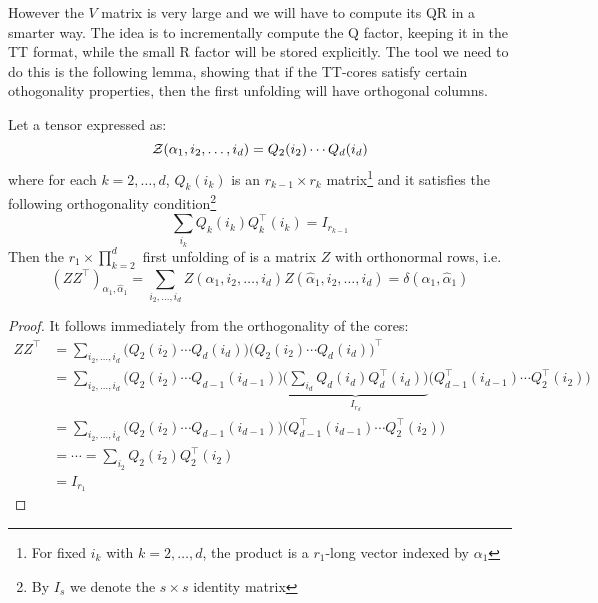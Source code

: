 However the $V$ matrix is very large and we will have to compute its QR in a smarter way. The idea is to incrementally compute the Q factor, keeping it in the TT format, while the small R factor will be stored explicitly. The tool we need to do this is the following lemma, showing that if the TT-cores satisfy certain othogonality properties, then the first unfolding will have orthogonal columns.
\begin{Lemma}
  Let a tensor \Z expressed as:
  \begin{equation*}
    \mathcal{Z}(\alpha_1,i_2,\ldots,i_d) = Q_2(i_2) \cdots Q_d(i_d)
  \end{equation*}
  where for each $k = 2,\ldots,d$, $Q_k(i_k)$ is an $r_{k-1} \times r_k$ matrix\footnote{For fixed $i_k$ with $k=2,\ldots,d$, the product is a $r_1$-long vector indexed by $\alpha_1$} and it satisfies the following orthogonality condition\footnote{By $I_s$ we denote the $s \times s$ identity matrix}
  \begin{equation} \label{eq:orth_cond}
    \sum_{i_k} Q_k(i_k) Q_k^{\top}(i_k) = I_{r_{k-1}}
  \end{equation}
  Then the $r_1 \times \prod_{k=2}^d$ first unfolding of \Z is a matrix $Z$ with orthonormal rows, i.e.
  \begin{equation*}
    (Z Z^\top)_{\alpha_1,\hat{\alpha}_1} = \sum_{i_2,\ldots,i_d} Z(\alpha_1,i_2,\ldots,i_d) Z(\hat{\alpha}_1,i_2,\ldots,i_d) = \delta(\alpha_1,\hat{\alpha}_1)
  \end{equation*}

  \begin{proof}
    It follows immediately from the orthogonality of the cores:
    \begin{equation*}
      \begin{split}
        ZZ^\top &= \sum_{i_2,\ldots,i_d} \Big( Q_2(i_2) \cdots Q_d(i_d) \Big) \Big( Q_2(i_2) \cdots Q_d(i_d) \Big)^\top \\
        &= \sum_{i_2,\ldots,i_d} \Big( Q_2(i_2) \cdots Q_{d-1}(i_{d-1}) \Big)
        \underbrace{\Big( \sum_{i_d} Q_d(i_d) Q_d^{\top}(i_d) \Big)}_{I_{r_d}}
        \Big( Q_{d-1}^\top(i_{d-1}) \cdots Q_2^\top(i_2) \Big) \\
        &= \sum_{i_2,\ldots,i_d} \Big( Q_2(i_2) \cdots Q_{d-1}(i_{d-1}) \Big)
        \Big( Q_{d-1}^\top(i_{d-1}) \cdots Q_2^\top(i_2) \Big) \\
        &= \cdots = \sum_{i_2} Q_2(i_2) Q_2^{\top}(i_2) \\
        &= I_{r_1}
      \end{split}
    \end{equation*}
  \end{proof}
\end{Lemma}

